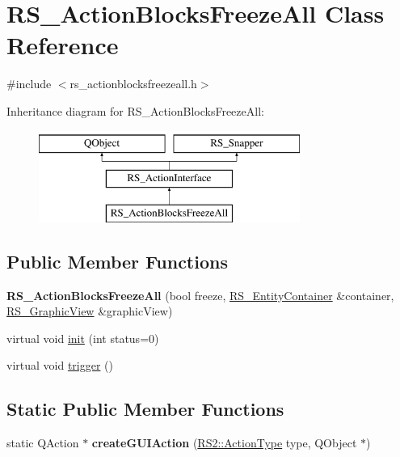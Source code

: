 \hypertarget{classRS__ActionBlocksFreezeAll}{\section{R\-S\-\_\-\-Action\-Blocks\-Freeze\-All Class Reference}
\label{classRS__ActionBlocksFreezeAll}
}


{\ttfamily \#include $<$rs\-\_\-actionblocksfreezeall.\-h$>$}

Inheritance diagram for R\-S\-\_\-\-Action\-Blocks\-Freeze\-All\-:\begin{figure}[H]
\begin{center}
\leavevmode
\includegraphics[height=3.000000cm]{classRS__ActionBlocksFreezeAll}
\end{center}
\end{figure}
\subsection*{Public Member Functions}
\begin{DoxyCompactItemize}
\item 
\hypertarget{classRS__ActionBlocksFreezeAll_a28c67fa182012f5ef3dd57fe7f5a7cc4}{{\bfseries R\-S\-\_\-\-Action\-Blocks\-Freeze\-All} (bool freeze, \hyperlink{classRS__EntityContainer}{R\-S\-\_\-\-Entity\-Container} \&container, \hyperlink{classRS__GraphicView}{R\-S\-\_\-\-Graphic\-View} \&graphic\-View)}\label{classRS__ActionBlocksFreezeAll_a28c67fa182012f5ef3dd57fe7f5a7cc4}

\item 
virtual void \hyperlink{classRS__ActionBlocksFreezeAll_a794476f8b72e0dc662ba05d6b12b8bb2}{init} (int status=0)
\item 
virtual void \hyperlink{classRS__ActionBlocksFreezeAll_af426c56bb4f0b513acbf425c556a6ee2}{trigger} ()
\end{DoxyCompactItemize}
\subsection*{Static Public Member Functions}
\begin{DoxyCompactItemize}
\item 
\hypertarget{classRS__ActionBlocksFreezeAll_a30f4eee0dce32ac9b3ef6a2301c5e89c}{static Q\-Action $\ast$ {\bfseries create\-G\-U\-I\-Action} (\hyperlink{classRS2_afe3523e0bc41fd637b892321cfc4b9d7}{R\-S2\-::\-Action\-Type} type, Q\-Object $\ast$)}\label{classRS__ActionBlocksFreezeAll_a30f4eee0dce32ac9b3ef6a2301c5e89c}

\end{DoxyCompactItemize}
